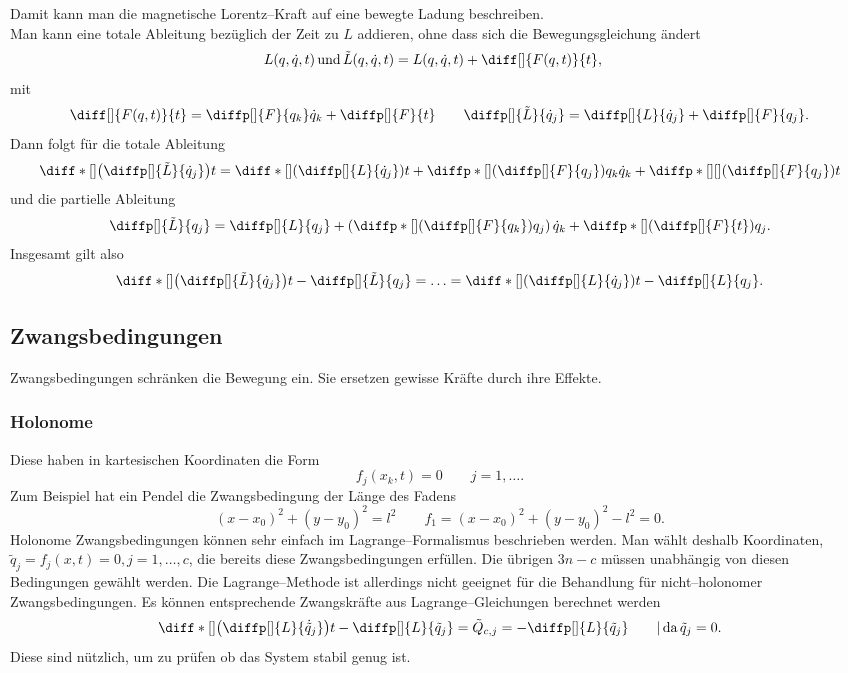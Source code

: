 \documentclass[a4paper,12pt]{article}
\numberwithin{equation}{section}
\begin{document}
Damit kann man die magnetische Lorentz--Kraft auf eine bewegte Ladung beschreiben.\\\indent
Man kann eine totale Ableitung bezüglich der Zeit zu $L$ addieren, ohne dass sich die Bewegungsgleichung ändert
\begin{align*}
        L(q,\dot{q},t)\,\text{und}\,\tilde L(q,\dot{q},t)&=L(q,\dot{q},t)+\diff[]{F(q,t)}{t}
,\end{align*}
mit 
\[ 
        \diff[]{F(q,t)}{t}=\diffp[]{F}{q_k}\dot{q}_k+\diffp[]{F}{t}\qquad \diffp[]{\tilde L}{\dot{q}_j}=\diffp[]{L}{\dot{q}_j}+\diffp[]{F}{q_j}
.\] 
Dann folgt für die totale Ableitung
\begin{align*}
        \diff*[]{\left(\diffp[]{\tilde L}{\dot{q}_j}\right)}{t}=\diff*[]{\left(\diffp[]{L}{\dot{q}_j}\right)}{t}+\diffp*[]{\left(\diffp[]{F}{q_j}\right)}{q_k}\dot{q}_k+\diffp*[]{}{}[]{\left(\diffp[]{F}{q_j}\right)}{t}
\end{align*}
und die partielle Ableitung
\begin{align*}
        \diffp[]{\tilde L}{q_j}=\diffp[]{L}{q_j}+\left(\diffp*[]{\left(\diffp[]{F}{q_k}\right)}{q_j}\right)\dot{q}_k+\diffp*[]{\left(\diffp[]{F}{t}\right)}{q_j}
.\end{align*}
Insgesamt gilt also
\begin{align*}
        \diff*[]{\left(\diffp[]{\tilde L}{\dot{q}_j}\right)}{t}-\diffp[]{\tilde L}{q_j}=\hdots =\diff*[]{\left(\diffp[]{L}{\dot{q}_j}\right)}{t}-\diffp[]{L}{q_j}
.\end{align*}

\subsection{Zwangsbedingungen}
Zwangsbedingungen schränken die Bewegung ein. Sie ersetzen gewisse Kräfte durch ihre Effekte.

\subsubsection{Holonome}
Diese haben in kartesischen Koordinaten die Form
\[ 
        f_j(x_k,t)=0\qquad j=1,\hdots 
.\] 
Zum Beispiel hat ein Pendel die Zwangsbedingung der Länge des Fadens
\[ 
        \left(x-x_0\right)^2+\left(y-y_0\right)^2=l^2\qquad f_1=\left(x-x_0\right)^2+\left(y-y_0\right)^2-l^2=0
.\] 
Holonome Zwangsbedingungen können sehr einfach im Lagrange--Formalismus beschrieben werden. Man wählt deshalb Koordinaten, $\tilde q_j=f_j(x,t)=0,j=1,\hdots ,c$, die bereits diese Zwangsbedingungen erfüllen. Die übrigen $3n-c$ müssen unabhängig von diesen Bedingungen gewählt werden. Die Lagrange--Methode ist allerdings nicht geeignet für die Behandlung für nicht--holonomer Zwangsbedingungen. Es können entsprechende Zwangskräfte aus Lagrange--Gleichungen berechnet werden
\[ 
        \diff*[]{\left(\diffp[]{L}{\dot{\tilde q}_j}\right)}{t}-\diffp[]{L}{{\tilde q}_j}=\tilde Q_{c,j}=-\diffp[]{L}{\tilde q_j}\qquad |\,\text{da}\,\tilde q_j=0
.\] 
Diese sind nützlich, um zu prüfen ob das System stabil genug ist. 
\end{document}
